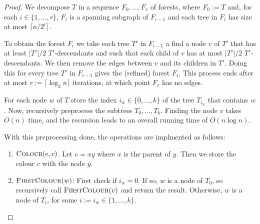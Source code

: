 \documentclass[kpfonts]{patmorin}
\begin{document}
\begin{proof}
    We decompose $T$ in a sequence $F_0,\ldots,F_r$ of forests, where $F_0:=T$ and, for each $i\in\{1,\ldots,r\}$, $F_i$ is a spanning subgraph of $F_{i-1}$ and each tree in $F_i$ has size at most $\lceil n/2^i\rceil$.  

    To obtain the forest $F_i$ we take each tree $T'$ in $F_{i-1}$
    a find a node $v$ of $T'$ that has at least $|T'|/2$ $T'$-descendants and such that each child of $v$ has at most $|T'|/2$ $T'$-descendants.  We then remove the edges between $v$ and its children in $T'$.  Doing this for every tree $T'$ in $F_{i-1}$ gives the (refined) forest $F_i$.  This process ends after at most $r:=\lceil\log_2 n\rceil$ iterations, at which point $F_r$ has no edges.  
    
    

    
    For each node $w$ of $T$ store the index $i_w\in\{0,\ldots,k\}$ of the tree $T_{i_w}$ that contains $w$.  Now, recursively preprocess the subtrees $T_0,\ldots,T_k$.  Finding the node $v$ takes $O(n)$ time, and the recursion leads to an overall running time of $O(n\log n)$.
    
    With this preprocessing done, the operations are implmented as follows:
    \begin{enumerate}
    \item $\textsc{Colour}(e,c)$. Let $e=xy$ where $x$ is the parent of $y$.  Then we store the colour $c$ with the node $y$.
    
    \item $\textsc{FirstColour}(w)$:  First check if $i_w=0$.  If so, $w$ is a node of $T_0$, so recursively call $\textsc{FirstColour}(v)$ and return the result.  Otherwise, $w$ is a node of $T_{i}$, for some $i:=i_w\in\{1,\ldots,k\}$.  
    \end{enumerate}
    
  
\end{proof}
\end{document}
